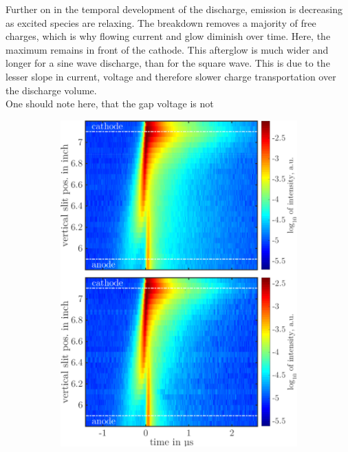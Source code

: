 \documentclass[a4paper,10pt,twoside]{article}
\begin{document}
\begin{multicols*}{2}
		Further on in the temporal development of the discharge, emission is decreasing as excited species are relaxing. The breakdown removes a majority of free charges, which is why flowing current and glow diminish over time. Here, the maximum remains in front of the cathode. This afterglow is much wider and longer for a sine wave discharge, than for the square wave. This is due to the lesser slope in current, voltage and therefore slower charge transportation over the discharge volume.\\
		One should note here, that the gap voltage is not 
			
	\end{multicols*}
	
			\begin{figure}
				\centering
				\begin{subfigure}[t]{0.49\textwidth}
					\includegraphics[width=\textwidth]{figures/lineratio/combinations/korr667over728.pdf}

\end{subfigure}
\end{figure}
\end{document}
